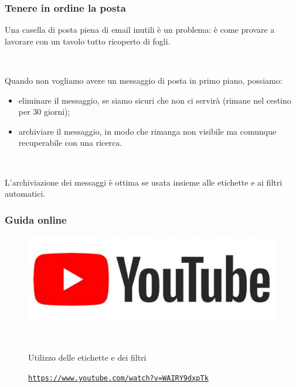 \documentclass[]{beamer}
\begin{document}
\begin{frame}
\frametitle{Tenere in ordine la posta}
Una casella di posta piena di email inutili è un problema: è come provare a lavorare con un tavolo tutto ricoperto di fogli.\pause

~

Quando non vogliamo avere un messaggio di posta in primo piano, possiamo:
\begin{itemize}
  \item \alert{eliminare il messaggio}, se siamo sicuri che non ci servirà (rimane nel cestino per 30 giorni);\pause
  \item \alert{archiviare il messaggio}, in modo che rimanga non visibile ma comunque recuperabile con una ricerca.\pause
\end{itemize}

~

L'archiviazione dei messaggi è ottima se usata insieme alle \alert{etichette} e ai \alert{filtri automatici}.
\end{frame}



\begin{frame}
\frametitle{Guida online}
\begin{figure}
  \includegraphics[width=.5\columnwidth]{img/ytlogo.jpg}
  
  ~
  
  Utilizzo delle etichette e dei filtri
  
  \href{https://www.youtube.com/watch?v=WAIRY9dxpTk}{\texttt{https://www.youtube.com/watch?v=WAIRY9dxpTk}}
\end{figure}
\end{frame}
\end{document}
